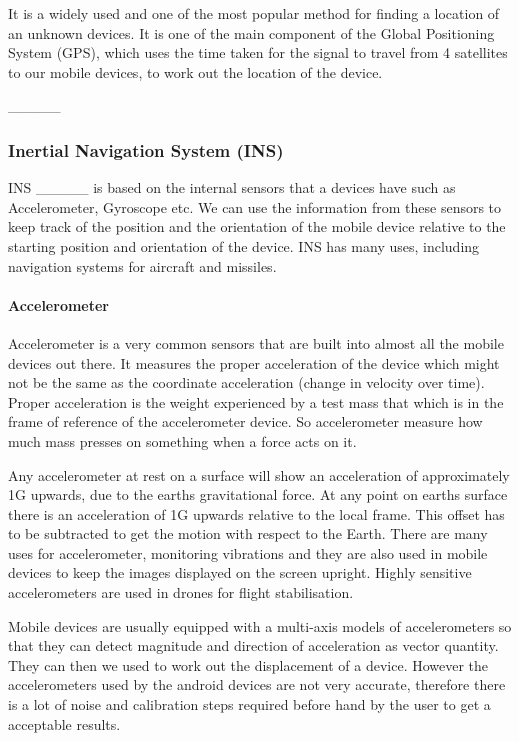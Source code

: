It is a widely used and one of the most popular method for finding
a location of an unknown devices. It is one of the main component
of the Global Positioning System (GPS), which uses the time taken
for the signal to travel from 4 satellites to our mobile devices,
to work out the location of the device.

\_\_\_\_\_ 


\subsubsection{Inertial Navigation System (INS)}

INS \_\_\_\_\_ is based on the internal sensors that a devices have
such as Accelerometer, Gyroscope etc. We can use the information from
these sensors to keep track of the position and the orientation of
the mobile device relative to the starting position and orientation
of the device. INS has many uses, including navigation systems for
aircraft and missiles.


\paragraph{Accelerometer} \label{accelerometer}

Accelerometer is a very common sensors that are built into almost
all the mobile devices out there. It measures the proper acceleration
of the device which might not be the same as the coordinate acceleration
(change in velocity over time). Proper acceleration is the weight
experienced by a test mass that which is in the frame of reference
of the accelerometer device. So accelerometer measure how much mass
presses on something when a force acts on it.

Any accelerometer at rest on a surface will show an acceleration of
approximately 1G upwards, due to the earths gravitational force. At
any point on earths surface there is an acceleration of 1G upwards
relative to the local frame. This offset has to be subtracted to get
the motion with respect to the Earth. There are many uses for accelerometer,
monitoring vibrations and they are also used in mobile devices to
keep the images displayed on the screen upright. Highly sensitive
accelerometers are used in drones for flight stabilisation.

Mobile devices are usually equipped with a multi-axis models of accelerometers
so that they can detect magnitude and direction of acceleration as
vector quantity. They can then we used to work out the displacement
of a device. However the accelerometers used by the android devices
are not very accurate, therefore there is a lot of noise and calibration
steps required before hand by the user to get a acceptable results.

